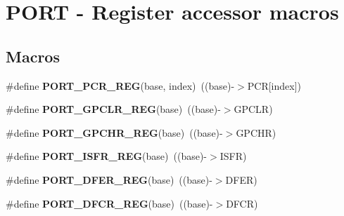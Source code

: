 \hypertarget{group__PORT__Register__Accessor__Macros}{}\section{P\+O\+RT -\/ Register accessor macros}
\label{group__PORT__Register__Accessor__Macros}
\subsection*{Macros}
\begin{DoxyCompactItemize}
\item 
\#define {\bfseries P\+O\+R\+T\+\_\+\+P\+C\+R\+\_\+\+R\+EG}(base,  index)~((base)-\/$>$P\+CR\mbox{[}index\mbox{]})\hypertarget{group__PORT__Register__Accessor__Macros_ga7a4a549c0ffd6b98b9fbfc0bdcfb5cea}{}\label{group__PORT__Register__Accessor__Macros_ga7a4a549c0ffd6b98b9fbfc0bdcfb5cea}

\item 
\#define {\bfseries P\+O\+R\+T\+\_\+\+G\+P\+C\+L\+R\+\_\+\+R\+EG}(base)~((base)-\/$>$G\+P\+C\+LR)\hypertarget{group__PORT__Register__Accessor__Macros_ga87d8b85c821b383c37cfedaa30eeb27c}{}\label{group__PORT__Register__Accessor__Macros_ga87d8b85c821b383c37cfedaa30eeb27c}

\item 
\#define {\bfseries P\+O\+R\+T\+\_\+\+G\+P\+C\+H\+R\+\_\+\+R\+EG}(base)~((base)-\/$>$G\+P\+C\+HR)\hypertarget{group__PORT__Register__Accessor__Macros_ga5b60d88d1233de175d8e51c5b65b3ff0}{}\label{group__PORT__Register__Accessor__Macros_ga5b60d88d1233de175d8e51c5b65b3ff0}

\item 
\#define {\bfseries P\+O\+R\+T\+\_\+\+I\+S\+F\+R\+\_\+\+R\+EG}(base)~((base)-\/$>$I\+S\+FR)\hypertarget{group__PORT__Register__Accessor__Macros_ga71010d47c68b6ac12dbc646ad2cd5a2f}{}\label{group__PORT__Register__Accessor__Macros_ga71010d47c68b6ac12dbc646ad2cd5a2f}

\item 
\#define {\bfseries P\+O\+R\+T\+\_\+\+D\+F\+E\+R\+\_\+\+R\+EG}(base)~((base)-\/$>$D\+F\+ER)\hypertarget{group__PORT__Register__Accessor__Macros_ga4f99b1317555cf43711d08c401a2a8bf}{}\label{group__PORT__Register__Accessor__Macros_ga4f99b1317555cf43711d08c401a2a8bf}

\item 
\#define {\bfseries P\+O\+R\+T\+\_\+\+D\+F\+C\+R\+\_\+\+R\+EG}(base)~((base)-\/$>$D\+F\+CR)\hypertarget{group__PORT__Register__Accessor__Macros_ga5299c28601ba392bb2b017064a14ebf8}{}\label{group__PORT__Register__Accessor__Macros_ga5299c28601ba392bb2b017064a14ebf8}


\end{DoxyCompactItemize}
